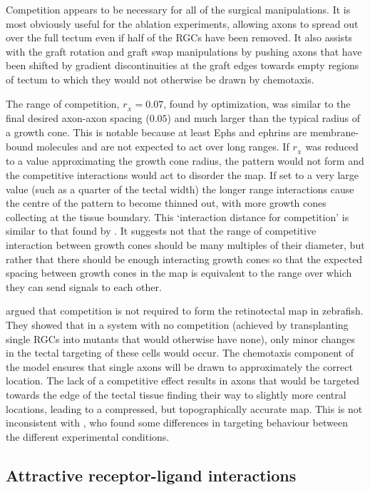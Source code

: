 \documentclass[9pt]{elife} %
\begin{document}
Competition appears to be necessary for all of the surgical manipulations.
It is most obviously useful for the ablation experiments, allowing axons to spread out over the full tectum even if half of the RGCs have been removed.
It also assists with the graft rotation and graft swap manipulations by pushing axons that have been shifted by gradient discontinuities at the graft edges towards empty regions of tectum to which they would not otherwise be drawn by chemotaxis.

The range of competition, $r_{\!_X}=0.07$, found by optimization, was similar to the final desired axon-axon spacing ($0.05$) and much larger than the typical radius of a growth cone. This is notable because at least Ephs and ephrins are membrane-bound molecules \citep{cang_developmental_2013} and are not expected to act over long ranges.
If $r_{\!_X}$ was reduced to a value approximating the growth cone radius, the pattern would not form and the competitive interactions would act to disorder the map.
If set to a very large value (such as a quarter of the tectal width) the longer range interactions cause the centre of the pattern to become thinned out, with more growth cones collecting at the tissue boundary.
This `interaction distance for competition' is similar to that found by \citet{simpson_simple_2011}.
It suggests not that the range of competitive interaction between growth cones should be many multiples of their diameter, but rather that there should be enough interacting growth cones so that the expected spacing between growth cones in the map is equivalent to the range over which they can send signals to each other.

\citet{gosse_retinotopic_2008} argued that competition is not required to form the retinotectal map in zebrafish. They showed that in a system with no competition (achieved by transplanting single RGCs into mutants that would otherwise have none), only minor changes in the tectal targeting of these cells would occur.
The chemotaxis component of the model ensures that single axons will be drawn to approximately the correct location.
The lack of a competitive effect results in axons that would be targeted towards the edge of the tectal tissue finding their way to slightly more central locations, leading to a compressed, but topographically accurate map.
This is not inconsistent with \citet{gosse_retinotopic_2008}, who found some differences in targeting behaviour between the different experimental conditions.

\subsection*{Attractive receptor-ligand interactions}
\end{document}
